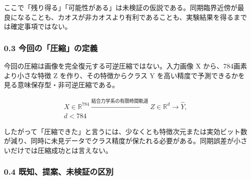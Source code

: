 \documentclass[11pt,a4paper]{ltjsarticle}
\begin{document}
ここで「残り得る」「可能性がある」は未検証の仮説である。同期臨界近傍が最良になることも、カオスが非カオスより有利であることも、実験結果を得るまでは確定事項ではない。\par

\subsubsection*{\textcolor{researchteal}{0.3 今回の「圧縮」の定義}}

今回の圧縮は画像を完全復元する可逆圧縮ではない。入力画像 X から、784画素より小さな特徴 Z を作り、その特徴からクラス Y を高い精度で予測できるかを見る意味保存型・非可逆圧縮である。\par

\[
\begin{gathered}
X\in\mathbb{R}^{784}
\xrightarrow{\text{結合力学系の有限時間軌道}}
Z\in\mathbb{R}^{d}
\longrightarrow \widehat{Y},\\
d<784
\end{gathered}
\]

したがって「圧縮できた」と言うには、少なくとも特徴次元または実効ビット数が減り、同時に未見データでクラス精度が保たれる必要がある。同期誤差が小さいだけでは圧縮成功とは言えない。\par

\subsubsection*{\textcolor{researchteal}{0.4 既知、提案、未検証の区別}}
\end{document}
